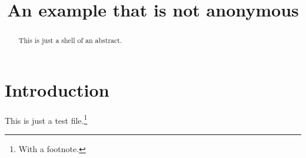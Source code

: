 \documentclass[journal=cic,version=preprint]{iacrj}
\title[running  = {The iacrcc class},
      ]{An example that is not anonymous}
\begin{document}
\maketitle


\begin{abstract}
This is just a shell of an abstract.
\end{abstract}

\section{Introduction}
This is just a test file.\footnote{With a footnote.}
\end{document}
